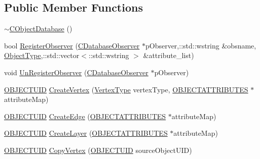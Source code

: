 \subsection*{Public Member Functions}
\begin{DoxyCompactItemize}
\item 
\hyperlink{class_n_m_1_1_o_d_b_1_1_c_object_database_ac22aeb28f89fdc575ff17e23196d13ad}{$\sim$\+C\+Object\+Database} ()
\item 
bool \hyperlink{class_n_m_1_1_o_d_b_1_1_c_object_database_aa5efd0c00741e844d60ac6d24bb501c5}{Register\+Observer} (\hyperlink{class_n_m_1_1_o_d_b_1_1_c_database_observer}{C\+Database\+Observer} $\ast$p\+Observer,\+::std\+::wstring \&obsname, \hyperlink{namespace_n_m_1_1_o_d_b_ac9f60beb4a1c8a6240dd0c8baa281345}{Object\+Type},\+::std\+::vector$<$\+::std\+::wstring $>$ \&attribute\+\_\+list)
\item 
void \hyperlink{class_n_m_1_1_o_d_b_1_1_c_object_database_a8213fa91ed5c5dc93d68399729e70d59}{Un\+Register\+Observer} (\hyperlink{class_n_m_1_1_o_d_b_1_1_c_database_observer}{C\+Database\+Observer} $\ast$p\+Observer)
\item 
\hyperlink{namespace_n_m_1_1_o_d_b_a262b64fab56baaa96e18bac4ada88265}{O\+B\+J\+E\+C\+T\+U\+I\+D} \hyperlink{class_n_m_1_1_o_d_b_1_1_c_object_database_a6dbe5739671f32073170e57601ff7ad6}{Create\+Vertex} (\hyperlink{namespace_n_m_1_1_o_d_b_a74e0c94daaeea6f7e783c03a8c921022}{Vertex\+Type} vertex\+Type, \hyperlink{namespace_n_m_1_1_o_d_b_a8770283da9792324e1afe8104d40123b}{O\+B\+J\+E\+C\+T\+A\+T\+T\+R\+I\+B\+U\+T\+E\+S} $\ast$attribute\+Map)
\item 
\hyperlink{namespace_n_m_1_1_o_d_b_a262b64fab56baaa96e18bac4ada88265}{O\+B\+J\+E\+C\+T\+U\+I\+D} \hyperlink{class_n_m_1_1_o_d_b_1_1_c_object_database_af00951e6e3d9368b223ce4a68da60afb}{Create\+Edge} (\hyperlink{namespace_n_m_1_1_o_d_b_a8770283da9792324e1afe8104d40123b}{O\+B\+J\+E\+C\+T\+A\+T\+T\+R\+I\+B\+U\+T\+E\+S} $\ast$attribute\+Map)
\item 
\hyperlink{namespace_n_m_1_1_o_d_b_a262b64fab56baaa96e18bac4ada88265}{O\+B\+J\+E\+C\+T\+U\+I\+D} \hyperlink{class_n_m_1_1_o_d_b_1_1_c_object_database_ae861a71ba9030e0abd909f751aae1bdf}{Create\+Layer} (\hyperlink{namespace_n_m_1_1_o_d_b_a8770283da9792324e1afe8104d40123b}{O\+B\+J\+E\+C\+T\+A\+T\+T\+R\+I\+B\+U\+T\+E\+S} $\ast$attribute\+Map)
\item 
\hyperlink{namespace_n_m_1_1_o_d_b_a262b64fab56baaa96e18bac4ada88265}{O\+B\+J\+E\+C\+T\+U\+I\+D} \hyperlink{class_n_m_1_1_o_d_b_1_1_c_object_database_a693e0861663bbc1f73f3477ba43bcdc1}{Copy\+Vertex} (\hyperlink{namespace_n_m_1_1_o_d_b_a262b64fab56baaa96e18bac4ada88265}{O\+B\+J\+E\+C\+T\+U\+I\+D} source\+Object\+U\+I\+D)

\end{DoxyCompactItemize}
